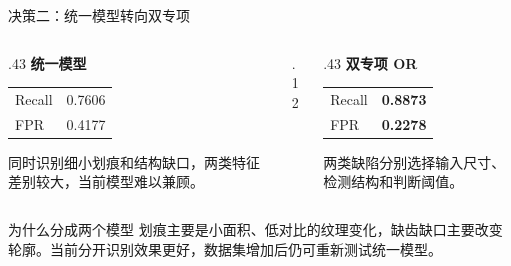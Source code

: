 \documentclass[aspectratio=169,10pt]{beamer}
\begin{document}
\begin{frame}{决策二：统一模型转向双专项}
  \begin{columns}[T,onlytextwidth]
    \begin{column}{.43\textwidth}
      \centering
      {\large\bfseries 统一模型}

      \vspace{.7em}
      \begin{tabular}{lr}
        Recall & 0.7606 \\
        FPR & 0.4177 \\
      \end{tabular}

      \vspace{1.0em}
      同时识别细小划痕和结构缺口，两类特征差别较大，当前模型难以兼顾。
    \end{column}
    \begin{column}{.12\textwidth}
      \centering\vspace{2em}{\color{seugold}\Huge$\Rightarrow$}
    \end{column}
    \begin{column}{.43\textwidth}
      \centering
      {\large\bfseries 双专项 OR}

      \vspace{.7em}
      \begin{tabular}{lr}
        Recall & \textbf{0.8873} \\
        FPR & \textbf{0.2278} \\
      \end{tabular}

      \vspace{1.0em}
      两类缺陷分别选择输入尺寸、检测结构和判断阈值。
    \end{column}
  \end{columns}

  \vfill
  \begin{block}{为什么分成两个模型}
    划痕主要是小面积、低对比的纹理变化，缺齿缺口主要改变轮廓。当前分开识别效果更好，数据集增加后仍可重新测试统一模型。
  \end{block}
\end{frame}

\end{document}
